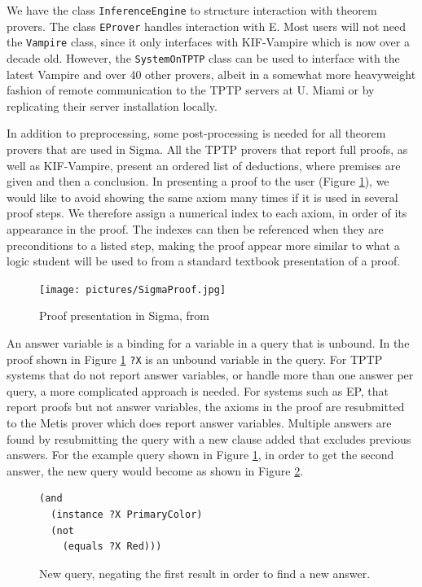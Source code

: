 \documentclass{book}
\begin{document}
We have the class \texttt{InferenceEngine} to
structure interaction with theorem provers.  The class
\texttt{EProver} handles interaction with E.  Most users
will not need the \texttt{Vampire} class, since it only
interfaces with KIF-Vampire which is now over a decade old.  However, the
\texttt{SystemOnTPTP} class can be used to
interface with the latest Vampire and over 40 other provers, albeit in a
somewhat more heavyweight fashion of remote communication to the TPTP servers at
U. Miami or by replicating their server installation locally.

In addition to preprocessing, some post-processing is needed for all theorem
provers that are used in Sigma.  All the TPTP provers that report full proofs,
as well as KIF-Vampire, present an ordered list of deductions, where premises
are given and then a conclusion.  In presenting a proof to the user (Figure
\ref{fig:SigmaProof}), we would like to avoid showing the same axiom many times
if it is used in several proof steps.  We therefore assign a numerical index to
each axiom, in order of its appearance in the proof.  The indexes can then be
referenced when they are preconditions to a listed step, making the proof appear
more similar to what a logic student will be used to from a standard textbook
presentation of a proof.

\begin{figure}
  \centering
  \texttt{[image: pictures/SigmaProof.jpg]}
  \caption{Proof presentation in Sigma, from \cite{tsp08}}
  \label{fig:SigmaProof}
\end{figure}

An answer variable is a binding for a variable in a query that is unbound. In
the proof shown in Figure \ref{fig:SigmaProof} {\tt ?X} is an unbound variable
in the query. For TPTP systems that do not report answer variables, or handle
more than one answer per query, a more complicated approach is needed.  For
systems such as EP, that report proofs but not answer variables, the axioms in
the proof are resubmitted to the Metis prover
\cite{hurd2003firstorder} which does report answer variables.  Multiple answers
are found by resubmitting the query with a new clause added that excludes
previous answers.  For the example query shown in Figure \ref{fig:SigmaProof},
in order to get the second answer, the new query would become as shown in Figure
\ref{fig:NegQuery}.

\begin{figure}
\begin{framed}
\begin{verbatim}
(and 
  (instance ?X PrimaryColor)
  (not
    (equals ?X Red)))
\end{verbatim}
\caption{New query, negating the first result in order to find a new answer.}
\label{fig:NegQuery}
\end{framed}
\end{figure}
\end{document}
